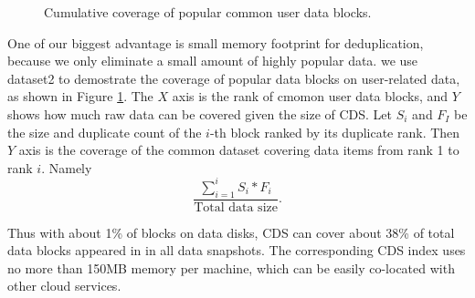  
\begin{figure}
\centering
{}

\caption{Cumulative  coverage of popular common user data blocks.}
\label{fig:userdatacoverage}
\end{figure}

One of our biggest advantage is small memory footprint for deduplication, because we only
eliminate a small amount of highly popular data.
we use dataset2 to demostrate the coverage of popular data blocks on user-related data, 
as shown in Figure \ref{fig:userdatacoverage}.
The $X$ axis is the rank of cmomon user data blocks, and $Y$ shows how much raw data can be covered given
the size of CDS.
Let $S_i$ and $F_I$ be the size and duplicate count 
of the $i$-th block ranked by its duplicate rank.  Then $Y$ axis is the coverage of
the common dataset covering data items from rank 1 to rank $i$. Namely  
\[
\frac{ \sum_{i=1}^{i} S_i * F_i} {\mbox{Total data size}}.
\]

Thus with about 1\% of blocks on data disks, CDS can cover about 38\% of total data blocks
appeared in in all data snapshots. The corresponding CDS index uses no more than 150MB memory per machine,
which can be easily co-located with other cloud services.






